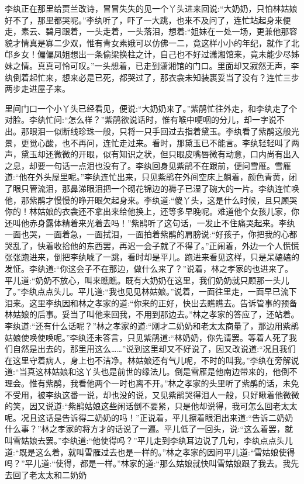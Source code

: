 \begin{parag}
    李纨正在那里给贾兰改诗，冒冒失失的见一个丫头进来回说:“大奶奶，只怕林姑娘好不了，那里都哭呢。”李纨听了，吓了一大跳，也来不及问了，连忙站起身来便走，素云、碧月跟着，一头走着，一头落泪，想着:“姐妹在一处一场，更兼他那容貌才情真是寡二少双，惟有青女素娥可以仿佛一二，竟这样小小的年纪，就作了北邙乡女！偏偏凤姐想出一条偷梁换柱之计，自己也不好过潇湘馆来，竟未能少尽姊妹之情。真真可怜可叹。”一头想着，已走到潇湘馆的门口。里面却又寂然无声，李纨倒着起忙来，想来必是已死，都哭过了，那衣衾未知装裹妥当了没有？连忙三步两步走进屋子来。
\end{parag}


\begin{parag}
    里间门口一个小丫头已经看见，便说:“大奶奶来了。”紫鹃忙往外走，和李纨走了个对脸。李纨忙问:“怎么样？”紫鹃欲说话时，惟有喉中哽咽的分儿，却一字说不出。那眼泪一似断线珍珠一般，只将一只手回过去指着黛玉。李纨看了紫鹃这般光景，更觉心酸，也不再问，连忙走过来。看时，那黛玉已不能言。李纨轻轻叫了两声，黛玉却还微微的开眼，似有知识之状，但只眼皮嘴唇微有动意，口内尚有出入之息，却要一句话一点泪也没有了。李纨回身见紫鹃不在跟前，便问雪雁。雪雁道:“他在外头屋里呢。”李纨连忙出来，只见紫鹃在外间空床上躺着，颜色青黄，闭了眼只管流泪，那鼻涕眼泪把一个砌花锦边的褥子已湿了碗大的一片。李纨连忙唤他，那紫鹃才慢慢的睁开眼欠起身来。李纨道:“傻丫头，这是什么时候，且只顾哭你的！林姑娘的衣衾还不拿出来给他换上，还等多早晚呢。难道他个女孩儿家，你还叫他赤身露体精着来光着去吗！”紫鹃听了这句话，一发止不住痛哭起来。李纨一面也哭，一面着急，一面拭泪，一面拍着紫鹃的肩膀说:“好孩子，你把我的心都哭乱了，快着收拾他的东西罢，再迟一会子就了不得了。”正闹着，外边一个人慌慌张张跑进来，倒把李纨唬了一跳，看时却是平儿。跑进来看见这样，只是呆磕磕的发怔。李纨道:“你这会子不在那边，做什么来了？”说着，林之孝家的也进来了。平儿道:“奶奶不放心，叫来瞧瞧。既有大奶奶在这里，我们奶奶就只顾那一头儿了。”李纨点点头儿。平儿道:“我也见见林姑娘。”说着，一面往里走，一面早已流下泪来。这里李纨因和林之孝家的道:“你来的正好，快出去瞧瞧去。告诉管事的预备林姑娘的后事。妥当了叫他来回我，不用到那边去。”林之孝家的答应了，还站着。李纨道:“还有什么话呢？”林之孝家的道:“刚才二奶奶和老太太商量了，那边用紫鹃姑娘使唤使唤呢。”李纨还未答言，只见紫鹃道:“林奶奶，你先请罢。等着人死了我们自然是出去的，那里用这么……”说到这里却又不好说了，因又改说道:“况且我们在这里守着病人，身上也不洁净。林姑娘还有气儿呢，不时的叫我。”李纨在旁解说道:“当真这林姑娘和这丫头也是前世的缘法儿。倒是雪雁是他南边带来的，他倒不理会。惟有紫鹃，我看他两个一时也离不开。”林之孝家的头里听了紫鹃的话，未免不受用，被李纨这番一说，却也没的说，又见紫鹃哭得泪人一般，只好瞅着他微微的笑，因又说道:“紫鹃姑娘这些闲话倒不要紧，只是他却说得，我可怎么回老太太呢。况且这话是告诉得二奶奶的吗！”正说着，平儿擦着眼泪出来道:“告诉二奶奶什么事？”林之孝家的将方才的话说了一遍。平儿低了一回头，说:“这么着罢，就叫雪姑娘去罢。”李纨道:“他使得吗？”平儿走到李纨耳边说了几句，李纨点点头儿道:“既是这么着，就叫雪雁过去也是一样的。”林之孝家的因问平儿道:“雪姑娘使得吗？”平儿道:“使得，都是一样。”林家的道:“那么姑娘就快叫雪姑娘跟了我去。我先去回了老太太和二奶奶
\end{parag}
